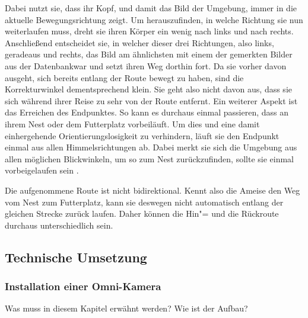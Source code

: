 \documentclass[12pt,a4paper,titlepage]{scrartcl}
\begin{document}
Dabei nutzt sie, dass ihr Kopf, und damit das Bild der Umgebung, immer in die aktuelle Bewegungsrichtung zeigt. Um herauszufinden, in welche Richtung sie nun weiterlaufen muss, dreht sie ihren Körper ein wenig nach links und nach rechts. Anschließend entscheidet sie, in welcher dieser drei Richtungen, also links, geradeaus und rechts, das Bild am ähnlichsten mit einem der gemerkten Bilder aus der \glqq Datenbank\grqq{ }war und setzt ihren Weg dorthin fort. 
Da sie vorher davon ausgeht, sich bereits entlang der Route bewegt zu haben, sind die Korrekturwinkel dementsprechend klein. Sie geht also nicht davon aus, dass sie sich während ihrer Reise zu sehr von der Route entfernt. Ein weiterer Aspekt ist das Erreichen des Endpunktes. So kann es durchaus einmal passieren, dass an ihrem Nest oder dem Futterplatz vorbeiläuft. Um dies und eine damit einhergehende Orientierungslosigkeit zu verhindern, läuft sie den Endpunkt einmal aus allen Himmelsrichtungen ab. Dabei merkt sie sich die Umgebung aus allen möglichen Blickwinkeln, um so zum Nest zurückzufinden, sollte sie einmal vorbeigelaufen sein \cite{baddeley2012model}. 

Die aufgenommene Route ist nicht bidirektional. Kennt also die Ameise den Weg vom Nest zum Futterplatz, kann sie deswegen nicht automatisch entlang der gleichen Strecke zurück laufen. Daher können die Hin"= und die Rückroute durchaus unterschiedlich sein.
\subsection{Technische Umsetzung}
\subsubsection{Installation einer Omni-Kamera}


Was muss in diesem Kapitel erwähnt werden? Wie ist der Aufbau?
\end{document}
